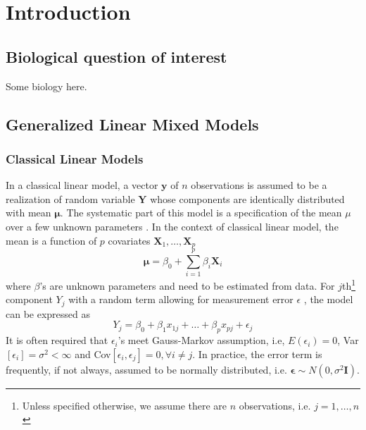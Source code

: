 \tableofcontents
\newpage

\section{Introduction}\label{sec:intro}

\subsection{Biological question of interest}\label{subsec:biol}
Some biology here.

\subsection{Generalized Linear Mixed Models}\label{subsec:glmm}
	\subsubsection{Classical Linear Models}
	In a classical linear model, a vector $\bm y$ of $n$ observations is assumed to be a realization of random variable $\bm Y$ whose components are identically distributed with mean $\bm \mu$. The systematic part of this model is a specification of the mean $\mu$ over a few unknown parameters \citep{mccullagh1989generalized}. In the context of classical linear model, the mean is a function of $p$ covariates $\bm X_1, \ldots, \bm X_p$
		\begin{equation}\label{q1}
			\bm \mu =\beta_0 + \sum_{i=1}^p\beta_i \bm X_i
		\end{equation}	
	where $\beta$'s are unknown parameters and need to be estimated from data.  For $j$th\footnote{Unless specified otherwise, we assume there are $n$ observations, i.e. $j=1, \ldots ,n$} component $ Y_j$ with a random term allowing for measurement error $\epsilon$ , the model can be expressed as 
		\begin{equation}\label{q2}
			Y_j= \beta_0 + \beta_1x_{1j} + \ldots + \beta_p x_{pj} + \epsilon_j
		\end{equation}
	It is often required that $\epsilon_i$'s meet Gauss-Markov assumption, i.e, $E(\epsilon_i)=0$, Var$[\epsilon_i]=
	\sigma^2<\infty$ and Cov$[\epsilon_i, \epsilon_j]=0, \forall i \neq j$. In practice, the error term is frequently, if not always, assumed to be normally distributed, i.e.  $\bm \epsilon \sim N(0, \sigma^2 \bm I)$. \\

